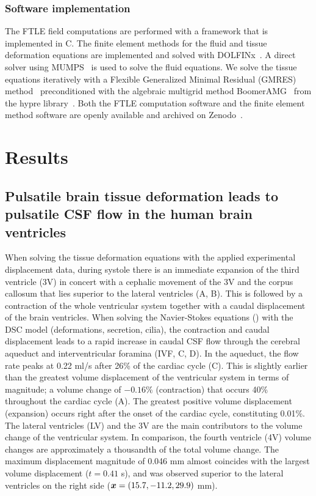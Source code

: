 \documentclass{template}
\begin{document}
\subsubsection{Software implementation}
The FTLE field computations are performed with a 
framework that is implemented in C.
The finite element methods for the fluid and tissue deformation equations
are implemented and solved with DOLFINx~\citep{baratta2023dolfinx}.
A direct solver using MUMPS~\citep{Amestoy2011Mumps} is used to solve the fluid equations.
We solve the tissue equations iteratively with a
Flexible Generalized Minimal Residual (GMRES) method~\citep{fgmres} 
preconditioned with the algebraic multigrid method
BoomerAMG~\citep{yang2002boomeramg} from the hypre library~\citep{hypre}. 
Both the FTLE computation software and the finite element method software
are openly available and archived on Zenodo~\citep{zenodoArchive}.

\section{Results}
\subsection{Pulsatile brain tissue deformation leads to pulsatile CSF flow in the human brain ventricles}\label{subsec:results_general}
When solving the tissue deformation equations with the applied
experimental displacement data, during systole there is an immediate expansion
of the third ventricle (3V) in concert with a cephalic movement of the 3V
and the corpus callosum that lies superior to the lateral ventricles
(A, B).
This is followed by a contraction of the whole
ventricular system together with a caudal displacement of
the brain ventricles. When solving the
Navier-Stokes equations () with the
DSC model (deformations, secretion, cilia), the contraction and
caudal displacement leads to a rapid increase in caudal CSF flow
through the cerebral aqueduct and interventricular foramina
(IVF, C, D).
In the aqueduct, the flow rate peaks at
0.22 ml/s after 26\% of the cardiac cycle (C).
This is slightly earlier than the greatest
volume displacement of the ventricular system
in terms of magnitude; a volume change of $-0.16\%$ (contraction)
that occurs 40\% throughout the cardiac cycle (A).
The greatest positive volume displacement (expansion) occurs right after
the onset of the cardiac cycle, constituting 0.01\%.
The lateral ventricles (LV) and the 3V are the main contributors to the volume
change of the ventricular system. In comparison, the fourth ventricle (4V) volume
changes are approximately a thousandth of the total volume change. 
The maximum displacement magnitude of 0.046 mm 
almost coincides with the largest volume displacement ($t=0.41$ s),
and was observed superior to the lateral ventricles on the right side
($\bm{x} = (15.7, -11.2, 29.9)$ mm).
\end{document}

